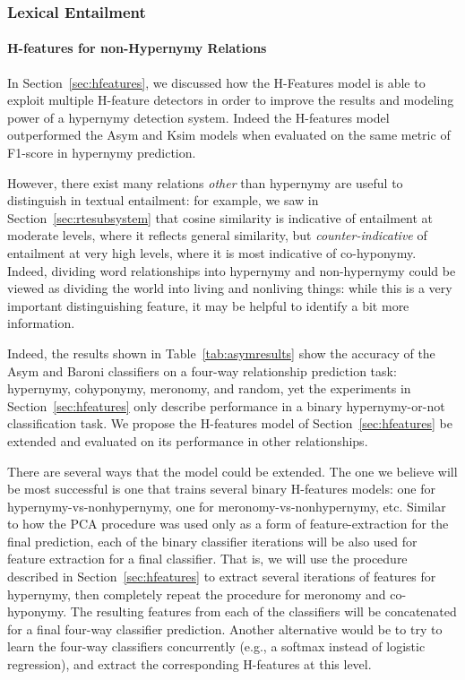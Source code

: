 \documentclass[12pt]{article}
\begin{document}
\subsubsection{Lexical Entailment}

\paragraph{H-features for non-Hypernymy Relations}

In Section~\ref{sec:hfeatures}, we discussed how the H-Features model
is able to exploit multiple H-feature detectors in order to improve the results
and modeling power of a hypernymy detection system. Indeed the H-features
model outperformed the Asym and Ksim models when evaluated on the same metric of
F1-score in hypernymy prediction.

However, there exist many relations {\em other} than hypernymy are useful to
distinguish in textual entailment: for example, we saw in
Section~\ref{sec:rtesubsystem} that cosine similarity is indicative of entailment
at moderate levels, where it reflects general similarity, but {\em counter-indicative}
of entailment at very high levels, where it is most indicative of co-hyponymy.
Indeed, dividing word relationships into hypernymy and non-hypernymy could be
viewed as dividing the world into living and nonliving things: while this is
a very important distinguishing feature, it may be helpful to identify a bit more
information.

Indeed, the results shown in Table~\ref{tab:asymresults} show
the accuracy of the Asym and Baroni classifiers on a four-way relationship
prediction task: hypernymy, cohyponymy, meronomy, and random, yet the
experiments in Section~\ref{sec:hfeatures} only describe performance in a
binary hypernymy-or-not classification task. We propose the H-features
model of Section~\ref{sec:hfeatures} be extended and evaluated on its
performance in other relationships.

There are several ways that the model could be extended. The one we believe
will be most successful is one that trains several binary H-features models:
one for hypernymy-vs-nonhypernymy, one for meronomy-vs-nonhypernymy, etc.
Similar to how the PCA procedure was used only as a form of feature-extraction
for the final prediction, each of the binary classifier iterations will be also
used for feature extraction for a final classifier.
That is, we will use the procedure described in Section~\ref{sec:hfeatures}
to extract several iterations of features for hypernymy, then completely repeat
the procedure for meronomy and co-hyponymy. The resulting features from each
of the classifiers will be concatenated for a final four-way classifier prediction.
Another alternative would be to try to learn the four-way classifiers concurrently
(e.g., a softmax instead of logistic regression), and extract the corresponding
H-features at this level.
\end{document}
